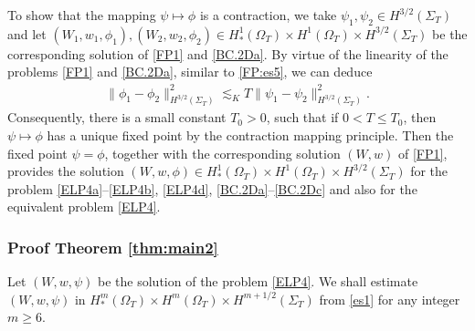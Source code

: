 \documentclass[twoside,11pt]{article}
\numberwithin{equation}{section}
\begin{document}
To show that the mapping ${\psi}\mapsto \phi$ is a contraction, we take
$\psi_1, \psi_2\in H^{3/2}(\Sigma_T)$ and let $(W_1, w_1, \phi_1), (W_2, w_2, \phi_2)\in H_*^{1}(\Omega_T)\times H^{1}(\Omega_T)\times H^{3/2}(\Sigma_T)$ be the corresponding solution of \eqref{FP1} and \eqref{BC.2Da}.
By virtue of the linearity of the problems \eqref{FP1} and \eqref{BC.2Da}, similar to \eqref{FP:es5}, we can deduce
\begin{align}
	\| \phi_1-\phi_2\|_{H^{3/2}(\Sigma_T)}^2
	\lesssim_K	
	T \|  \psi_1-\psi_2 \|_{H^{3/2}(\Sigma_T)}^2.
	\nonumber
\end{align}
Consequently, there is a small constant $T_0>0$, such that if $0<T\leq T_0$, then ${\psi}\mapsto \phi$ has a unique fixed point by the contraction mapping principle.
Then the fixed point ${\psi}=\phi$, together with the corresponding solution $(W,w)$ of \eqref{FP1}, provides the solution $(W , w , \phi ) \in H_*^{1}(\Omega_T)\times H^{1}(\Omega_T)\times H^{3/2}(\Sigma_T)$
for the problem \eqref{ELP4a}--\eqref{ELP4b}, \eqref{ELP4d}, \eqref{BC.2Da}--\eqref{BC.2Dc} and also for the equivalent problem \eqref{ELP4}.






\subsubsection{Proof Theorem \ref{thm:main2}}

Let $(W,w,\psi)$ be the solution of the problem \eqref{ELP4}.
We shall estimate $(W,w,\psi)$ in $H_*^m(\Omega_T)\times H^m(\Omega_T)\times H^{m+1/2}(\Sigma_T)$ from \eqref{es1} for any integer $m\geq 6$.
\end{document}
